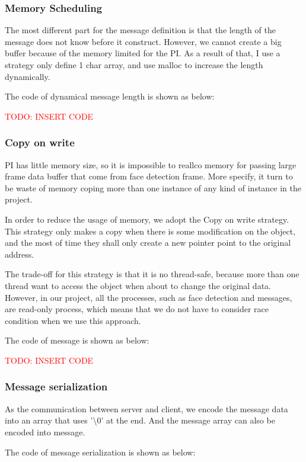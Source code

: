 \documentclass[11pt,a4paper,titlepage]{report}
\begin{document}
\subsubsection{Memory Scheduling}

The most different part for the message definition is that the length of the message does not know before it construct. However, we cannot create a big buffer because of the memory limited for the PI. As a result of that, I use a strategy only define 1 char array, and use malloc to increase the length dynamically.

The code of dynamical message length is shown as below:

\textcolor{red}{TODO: INSERT CODE}


\subsubsection{Copy on write}

PI has little memory size, so it is impossible to reallco memory for passing large frame data buffer that come from face detection frame. More specify, it turn to be waste of memory coping more than one instance of any kind of instance in the project. 

In order to reduce the usage of memory, we adopt the Copy on write strategy. This strategy only makes a copy when there is some modification on the object, and the most of time they shall only create a new pointer point to the original address.

The trade-off for this strategy is that it is no thread-safe, because more than one thread want to access the object when about to change the original data. However, in our project, all the processes, such as face detection and messages, are read-only process, which means that we do not have to consider race condition when we use this approach. 

The code of message is shown as below:


\textcolor{red}{TODO: INSERT CODE}

\subsubsection{Message serialization}


As the communication between server and client, we encode the message data into an array that uses '\textbackslash0' at the end. And the message array can also be encoded into message.

The code of message serialization is shown as below:
\end{document}
